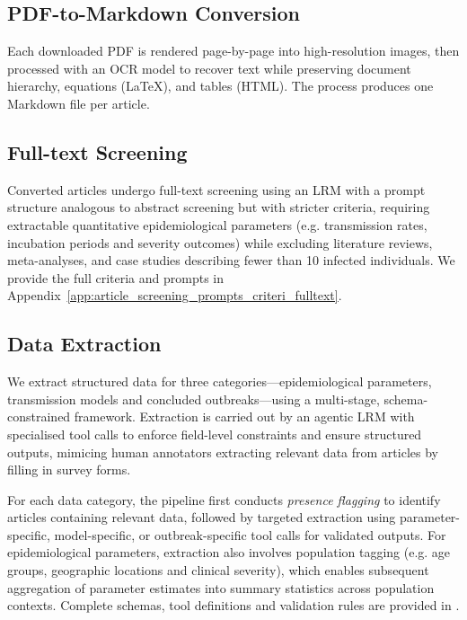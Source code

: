\subsection{PDF-to-Markdown Conversion}\label{sec:pdf_to_markdown_conversion}
Each downloaded PDF is rendered page-by-page into high-resolution images, then processed with an OCR model to recover text while preserving document hierarchy, equations (LaTeX), and tables (HTML). The process produces one Markdown file per article.
\subsection{Full-text Screening}
Converted articles undergo full-text screening using an LRM with a prompt structure analogous to abstract screening but with stricter criteria, requiring extractable quantitative epidemiological parameters (e.g. transmission rates, incubation periods and severity outcomes) while excluding literature reviews, meta-analyses, and case studies describing fewer than 10 infected individuals. We provide the full criteria and prompts in Appendix~\ref{app:article_screening_prompts_criteri_fulltext}.

\subsection{Data Extraction}\label{sec:data_extraction}
We extract structured data for three categories---epidemiological parameters, transmission models and concluded outbreaks---using a multi-stage, schema-constrained framework. Extraction is carried out by an agentic LRM with specialised tool calls to enforce field-level constraints and ensure structured outputs, mimicing human annotators extracting relevant data from articles by filling in survey forms.

For each data category, the pipeline first conducts \textit{presence flagging} to identify articles containing relevant data, followed by targeted extraction using parameter-specific, model-specific, or outbreak-specific tool calls for validated outputs. For epidemiological parameters, extraction also involves population tagging (e.g. age groups, geographic locations and clinical severity), which enables subsequent aggregation of parameter estimates into summary statistics across population contexts. Complete schemas, tool definitions and validation rules are provided in .


